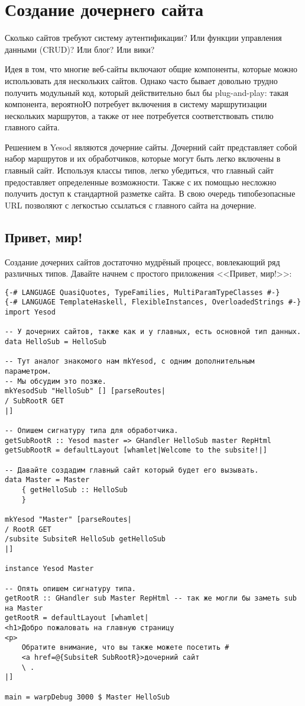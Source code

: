 \chapter{Создание дочернего сайта}

Сколько сайтов требуют систему аутентификации? Или функции управления данными (CRUD)? Или блог? Или вики?

Идея в том, что многие веб-сайты включают общие компоненты, которые можно использовать для нескольких сайтов. Однако часто бывает довольно трудно получить модульный код, который действительно был бы plug-and-play: такая компонента, вероятноЮ потребует включения в систему маршрутизации нескольких маршрутов, а также от нее потребуется соответствовать стилю главного сайта.

Решением в Yesod являются дочерние сайты. Дочерний сайт представляет собой набор маршрутов и их обработчиков, которые могут быть легко включены в главный сайт. Используя классы типов, легко убедиться, что главный сайт предоставляет определенные возможности. Также с их помощью несложно получить доступ к стандартной разметке сайта. В свою очередь типобезопасные URL позволяют с легкостью ссылаться с главного сайта на дочерние.

\section{Привет, мир!}

Создание дочерних сайтов достаточно мудрёный процесс, вовлекающий ряд различных типов. Давайте начнем с простого приложения <<Привет, мир!>>:

\begin{lstlisting}
{-# LANGUAGE QuasiQuotes, TypeFamilies, MultiParamTypeClasses #-}
{-# LANGUAGE TemplateHaskell, FlexibleInstances, OverloadedStrings #-}
import Yesod

-- У дочерних сайтов, также как и у главных, есть основной тип данных.
data HelloSub = HelloSub

-- Тут аналог знакомого нам mkYesod, с одним дополнительным параметром.
-- Мы обсудим это позже.
mkYesodSub "HelloSub" [] [parseRoutes|
/ SubRootR GET
|]

-- Опишем сигнатуру типа для обработчика.
getSubRootR :: Yesod master => GHandler HelloSub master RepHtml
getSubRootR = defaultLayout [whamlet|Welcome to the subsite!|]

-- Давайте создадим главный сайт который будет его вызывать.
data Master = Master
    { getHelloSub :: HelloSub
    }

mkYesod "Master" [parseRoutes|
/ RootR GET
/subsite SubsiteR HelloSub getHelloSub
|]

instance Yesod Master

-- Опять опишем сигнатуру типа.
getRootR :: GHandler sub Master RepHtml -- так же могли бы заметь sub на Master
getRootR = defaultLayout [whamlet|
<h1>Добро пожаловать на главную страницу
<p>
    Обратите внимание, что вы также можете посетить #
    <a href=@{SubsiteR SubRootR}>дочерний сайт
    \ .
|]

main = warpDebug 3000 $ Master HelloSub
\end{lstlisting}

